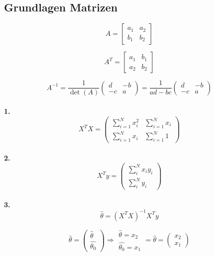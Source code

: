 \documentclass[12pt]{article}
\begin{document}
\noindent
   \begin{minipage}[t]{0.45\textwidth}

      \subsection*{Grundlagen Matrizen}

         \[
         A = \begin{bmatrix}
            a_1 & a_2 \\
            b_1 & b_2
         \end{bmatrix}
         \]

         \[
            A^T = \begin{bmatrix}
               a_1 & b_1 \\
               a_2 & b_2
         \end{bmatrix}
         \]

         \[
            A^{-1} = \frac{1}{\det(A)} \begin{pmatrix} 
               d & -b \\ 
               -c & a 
         \end{pmatrix} = \frac{1}{ad - bc} 
         \begin{pmatrix} 
            d & -b \\ 
            -c & a 
         \end{pmatrix}
         \] \\

         \textbf{1.}
         \[
            X^T X = \begin{pmatrix}
               \sum_{i=1}^{N} x_i^2 & \sum_{i=1}^{N} x_i \\[15pt]
               \sum_{i=1}^{N} x_i & \sum_{i=1}^{N} 1 
         \end{pmatrix}
         \] \\

         \textbf{2.}
         \[
            X^T y = \begin{pmatrix}
               \sum_{i}^{N} x_i y_i \\[10pt]
               \sum_{i}^{N} y_i 
            \end{pmatrix}
         \] \\

         \textbf{3.}
         \[
            \hat{\theta} = (X^T X)^{-1} X^T y   %
         \]

         \[
            \hat{\theta} = \begin{pmatrix}
               \hat{\theta} \\ 
               \hat{\theta_0}
         \end{pmatrix} \Rightarrow \begin{matrix}
            \hat{\theta} = x_2 \\ 
            \hat{\theta_0} = x_1
         \end{matrix} = \hat{\theta} = \begin{pmatrix}
            x_2 \\
            x_1
         \end{pmatrix}
         \] \\


\end{minipage}
\end{document}
